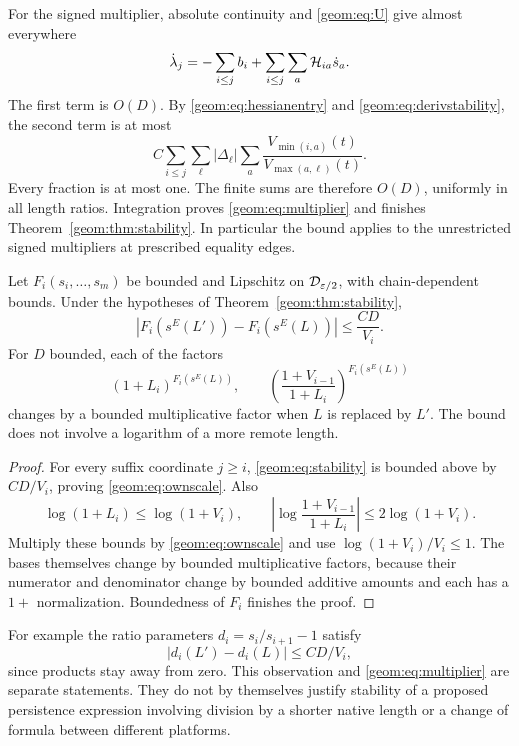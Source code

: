 For the signed multiplier, absolute continuity and
\eqref{geom:eq:U} give almost everywhere
\[
 \dot\lambda_j
   =-\sum_{i\le j}b_i
       +\sum_{i\le j}\sum_a\mathcal H_{ia}\dot s_a.
\]
The first term is \(O(D)\).  By \eqref{geom:eq:hessianentry} and
\eqref{geom:eq:derivstability}, the second term is at most
\[
 C\sum_{i\le j}\sum_\ell|\Delta_\ell|
          \sum_a\frac{V_{\min(i,a)}(t)}
                       {V_{\max(a,\ell)}(t)}.
\]
Every fraction is at most one.  The finite sums are therefore
\(O(D)\), uniformly in all length ratios.  Integration proves
\eqref{geom:eq:multiplier} and finishes Theorem~\ref{geom:thm:stability}.
In particular the bound applies to the unrestricted signed
multipliers at prescribed equality edges.

\begin{corollary}\label{geom:cor:ownscale}
Let \(F_i(s_i,\ldots,s_m)\) be bounded and Lipschitz on
\(\mathcal D_{\varepsilon/2}\), with chain-dependent bounds.  Under the
hypotheses of Theorem~\ref{geom:thm:stability},
\begin{equation}
 |F_i(s^E(L'))-F_i(s^E(L))|\le \frac{CD}{V_i}.
                                                        \label{geom:eq:ownscale}
\end{equation}
For \(D\) bounded, each of the factors
\[
 (1+L_i)^{F_i(s^E(L))},\qquad
 \left(\frac{1+V_{i-1}}{1+L_i}\right)^{F_i(s^E(L))}
\]
changes by a bounded multiplicative factor when \(L\) is replaced
by \(L'\).  The bound does not involve a logarithm of a more remote
length.
\end{corollary}

\begin{proof}
For every suffix coordinate \(j\ge i\), \eqref{geom:eq:stability} is
bounded above by \(CD/V_i\), proving \eqref{geom:eq:ownscale}.
Also
\[
 \log(1+L_i)\le\log(1+V_i),\qquad
 \left|\log\frac{1+V_{i-1}}{1+L_i}\right|
      \le2\log(1+V_i).
\]
Multiply these bounds by \eqref{geom:eq:ownscale} and use
\(\log(1+V_i)/V_i\le1\).
The bases themselves change by bounded multiplicative factors,
because their numerator and denominator change by bounded additive
amounts and each has a \(1+\) normalization.  Boundedness of \(F_i\)
finishes the proof.
\end{proof}

For example the ratio parameters \(d_i=s_i/s_{i+1}-1\) satisfy
\[
 |d_i(L')-d_i(L)|\le CD/V_i,
\]
since products stay away from zero.  This observation and
\eqref{geom:eq:multiplier} are separate statements.  They do not by
themselves justify stability of a proposed persistence expression
involving division by a shorter native length or a change of formula
between different platforms.

